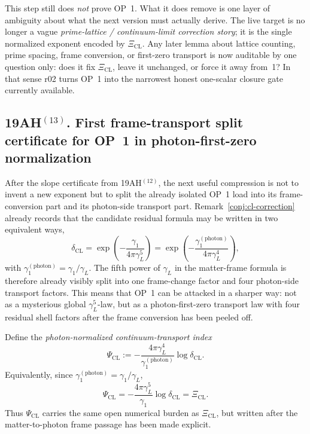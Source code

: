 \begin{remark}
This step still does \emph{not} prove OP~1. What it does remove is one layer of ambiguity about what the next version must actually derive. The live target is no longer a vague \emph{prime-lattice / continuum-limit correction story}; it is the single normalized exponent encoded by \(\Xi_{\mathrm{CL}}\). Any later lemma about lattice counting, prime spacing, frame conversion, or first-zero transport is now auditable by one question only: does it fix \(\Xi_{\mathrm{CL}}\), leave it unchanged, or force it away from~1? In that sense r02 turns OP~1 into the narrowest honest one-scalar closure gate currently available.
\end{remark}


\subsection*{19AH$^{(13)}$. First frame-transport split certificate for OP~1 in photon-first-zero normalization}
After the slope certificate from 19AH$^{(12)}$, the next useful compression is not to invent a new exponent but to split the already isolated OP~1 load into its frame-conversion part and its photon-side transport part. Remark~\ref{conj:cl-correction} already records that the candidate residual formula may be written in two equivalent ways,
\[
  \delta_{\mathrm{CL}}
  = \exp\!\left(-\frac{\gamma_1}{4\pi\gamma_L^5}\right)
  = \exp\!\left(-\frac{\gamma_1^{(\mathrm{photon})}}{4\pi\gamma_L^4}\right),
\]
with \(\gamma_1^{(\mathrm{photon})}=\gamma_1/\gamma_L\). The fifth power of \(\gamma_L\) in the matter-frame formula is therefore already visibly split into one frame-change factor and four photon-side transport factors. This means that OP~1 can be attacked in a sharper way: not as a mysterious global \(\gamma_L^5\)-law, but as a photon-first-zero transport law with four residual shell factors after the frame conversion has been peeled off.

\begin{definition}
\label{def:psi-cl}
Define the \emph{photon-normalized continuum-transport index}
\[
  \Psi_{\mathrm{CL}}
  :=
  -\frac{4\pi\gamma_L^4}{\gamma_1^{(\mathrm{photon})}}\log \delta_{\mathrm{CL}}.
\]
Equivalently, since \(\gamma_1^{(\mathrm{photon})}=\gamma_1/\gamma_L\),
\[
  \Psi_{\mathrm{CL}}
  =
  -\frac{4\pi\gamma_L^5}{\gamma_1}\log \delta_{\mathrm{CL}}
  = \Xi_{\mathrm{CL}}.
\]
Thus \(\Psi_{\mathrm{CL}}\) carries the same open numerical burden as \(\Xi_{\mathrm{CL}}\), but written after the matter-to-photon frame passage has been made explicit.
\end{definition}

